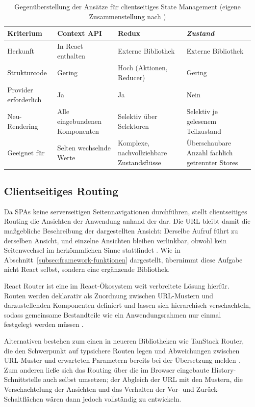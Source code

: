 \begin{table}[H]
\centering
\caption{Gegenüberstellung der Ansätze für clientseitiges State
Management (eigene Zusammenstellung nach \cite{react_docs, redux_docs,
zustand_docs, le_state_management})}
\label{tab:state-management}
\small
\begin{tabular}{|p{2.6cm}|p{3.2cm}|p{3.2cm}|p{3.2cm}|}
\hline
\textbf{Kriterium} & \textbf{Context \acs{API}} &
\textbf{Redux} & \textbf{\textit{Zustand}} \\
\hline
Herkunft & In React enthalten & Externe Bibliothek &
Externe Bibliothek \\
\hline
Struktur\-code & Gering & Hoch (Aktionen, Reducer) & Gering \\
\hline
Provider erforderlich & Ja & Ja & Nein \\
\hline
Neu-Rendering & Alle eingebundenen Komponenten &
Selektiv über Selektoren & Selektiv je gelesenem Teilzustand \\
\hline
Geeignet für & Selten wechselnde Werte &
Komplexe, nachvollziehbare Zustandsflüsse &
Überschaubare Anzahl fachlich getrennter Stores \\
\hline
\end{tabular}
\end{table}


\subsection{Clientseitiges Routing}
\label{subsec:routing}

Da \acs{SPA}s keine serverseitigen Seitennavigationen durchführen,
stellt clientseitiges Routing die Ansichten der Anwendung anhand der
 dar. Die \acs{URL} bleibt damit die maßgebliche Beschreibung der
dargestellten Ansicht: Derselbe Aufruf führt zu derselben Ansicht,
und einzelne Ansichten bleiben verlinkbar, obwohl kein Seitenwechsel
im herkömmlichen Sinne stattfindet \cite{bhalla_spa_architecture}. Wie in
Abschnitt~\ref{subsec:framework-funktionen} dargestellt, übernimmt
diese Aufgabe nicht React selbst, sondern eine ergänzende
Bibliothek.

React Router ist eine im React-Ökosystem weit verbreitete Lösung
hierfür. Routen werden deklarativ als Zuordnung zwischen
\acs{URL}-Mustern und darzustellenden Komponenten definiert und
lassen sich hierarchisch verschachteln, sodass gemeinsame
Bestandteile wie ein Anwendungsrahmen nur einmal festgelegt werden
müssen \cite{reactrouter_docs}.

Alternativen bestehen zum einen in neueren Bibliotheken wie TanStack
Router, die den Schwerpunkt auf typsichere Routen legen und
Abweichungen zwischen \acs{URL}-Muster und erwarteten Parametern
bereits bei der Übersetzung melden \cite{tanstack_router_docs}. Zum
anderen ließe sich das Routing über die im Browser eingebaute
History-Schnittstelle auch selbst umsetzen; der Abgleich der
\acs{URL} mit den Mustern, die Verschachtelung der Ansichten und das
Verhalten der Vor- und Zurück-Schaltflächen wären dann jedoch
vollständig zu entwickeln.

